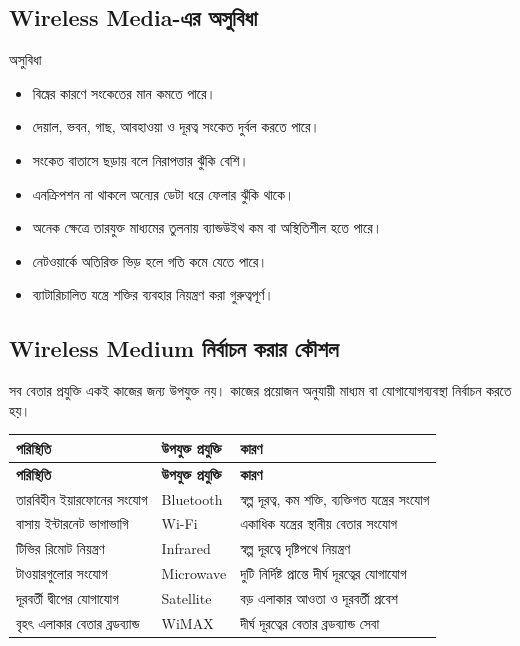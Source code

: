 \subsection{Wireless Media-এর অসুবিধা}

\begin{keypointbox}{অসুবিধা}
\begin{itemize}
\item বিঘ্নের কারণে সংকেতের মান কমতে পারে।
\item দেয়াল, ভবন, গাছ, আবহাওয়া ও দূরত্ব সংকেত দুর্বল করতে পারে।
\item সংকেত বাতাসে ছড়ায় বলে নিরাপত্তার ঝুঁকি বেশি।
\item এনক্রিপশন না থাকলে অন্যের ডেটা ধরে ফেলার ঝুঁকি থাকে।
\item অনেক ক্ষেত্রে তারযুক্ত মাধ্যমের তুলনায় ব্যান্ডউইথ কম বা অস্থিতিশীল হতে পারে।
\item নেটওয়ার্কে অতিরিক্ত ভিড় হলে গতি কমে যেতে পারে।
\item ব্যাটারিচালিত যন্ত্রে শক্তির ব্যবহার নিয়ন্ত্রণ করা গুরুত্বপূর্ণ।
\end{itemize}
\end{keypointbox}

\subsection{Wireless Medium নির্বাচন করার কৌশল}

সব বেতার প্রযুক্তি একই কাজের জন্য উপযুক্ত নয়। কাজের প্রয়োজন অনুযায়ী মাধ্যম বা যোগাযোগব্যবস্থা নির্বাচন করতে হয়।

\begingroup
\begin{longtable}{|p{}|p{}|p{}|}
\hline
\textbf{পরিস্থিতি} & \textbf{উপযুক্ত প্রযুক্তি} & \textbf{কারণ} \\
\hline
\endfirsthead
\hline
\textbf{পরিস্থিতি} & \textbf{উপযুক্ত প্রযুক্তি} & \textbf{কারণ} \\
\hline
\endhead

তারবিহীন ইয়ারফোনের সংযোগ & Bluetooth & স্বল্প দূরত্ব, কম শক্তি, ব্যক্তিগত যন্ত্রের সংযোগ \\
\hline
বাসায় ইন্টারনেট ভাগাভাগি & Wi-Fi & একাধিক যন্ত্রের স্থানীয় বেতার সংযোগ \\
\hline
টিভির রিমোট নিয়ন্ত্রণ & Infrared & স্বল্প দূরত্বে দৃষ্টিপথে নিয়ন্ত্রণ \\
\hline
টাওয়ারগুলোর সংযোগ & Microwave & দুটি নির্দিষ্ট প্রান্তে দীর্ঘ দূরত্বের যোগাযোগ \\
\hline
দূরবর্তী দ্বীপের যোগাযোগ & Satellite & বড় এলাকার আওতা ও দূরবর্তী প্রবেশ \\
\hline
বৃহৎ এলাকার বেতার ব্রডব্যান্ড & WiMAX & দীর্ঘ দূরত্বের বেতার ব্রডব্যান্ড সেবা \\
\hline
\end{longtable}
\endgroup

